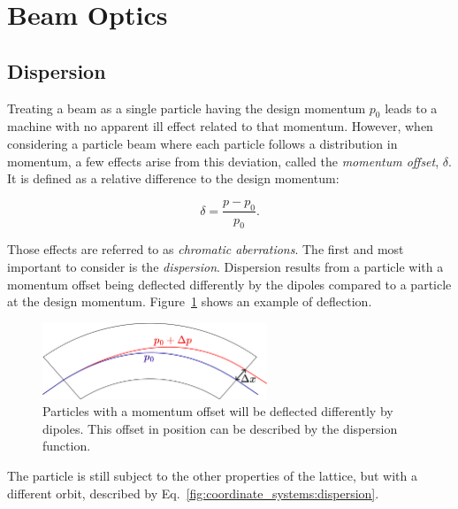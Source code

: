 \section{Beam Optics}


\subsection{Dispersion}

Treating a beam as a single particle having the design momentum $p_0$ leads to a machine with no
apparent ill effect related to that momentum.
However, when considering a particle beam where each particle follows a distribution in
momentum, a few effects arise from this deviation, called the \textit{momentum offset},
$\delta$. It is defined as a relative difference to the design momentum:

\begin{equation}
    \delta = \frac{p - p_0}{p_0}.
    \label{eq:coordinate_systems:momentum_offset}
\end{equation}

Those effects are referred to as \textit{chromatic aberrations}. The first and most important to
consider is the \textit{dispersion}. Dispersion results from a particle with a momentum offset
being deflected differently by the dipoles compared to a particle at the design momentum.
Figure~\ref{fig:coordinate_systems:dispersion} shows an example of deflection. 

\begin{figure}[H]
    \centering
    \includegraphics[width=0.6\textwidth]{images/dipole.png}
    \caption{Particles with a momentum offset will be deflected differently by dipoles. This offset
            in position can be described by the dispersion function.}
    \label{fig:coordinate_systems:dispersion}
\end{figure}

The particle is still subject to the other properties of the lattice, but with a different orbit,
described by Eq.~\eqref{fig:coordinate_systems:dispersion}.


